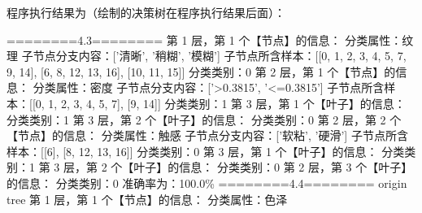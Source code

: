 \documentclass{ctexart}
\begin{document}
程序执行结果为（绘制的决策树在程序执行结果后面）：
\begin{tcolorbox}[colframe = blue, colback = blue!10!white ,  breakable]
========4.3========\newline
第 1 层，第 1 个【节点】的信息：\newline
        分类属性：纹理\newline
        子节点分支内容：['清晰', '稍糊', '模糊']\newline
        子节点所含样本：[[0, 1, 2, 3, 4, 5, 7, 9, 14], [6, 8, 12, 13, 16], [10, 11, 15]]\newline
        分类类别：0\newline
第 2 层，第 1 个【节点】的信息：\newline
        分类属性：密度\newline
        子节点分支内容：['>0.3815', '<=0.3815']\newline
        子节点所含样本：[[0, 1, 2, 3, 4, 5, 7], [9, 14]]\newline
        分类类别：1\newline
第 3 层，第 1 个【叶子】的信息：\newline
        分类类别：1\newline
第 3 层，第 2 个【叶子】的信息：\newline
        分类类别：0\newline
第 2 层，第 2 个【节点】的信息：\newline
        分类属性：触感\newline
        子节点分支内容：['软粘', '硬滑']\newline
        子节点所含样本：[[6], [8, 12, 13, 16]]\newline
        分类类别：0\newline
第 3 层，第 1 个【叶子】的信息：\newline
        分类类别：1\newline
第 3 层，第 2 个【叶子】的信息：\newline
        分类类别：0\newline
第 2 层，第 3 个【叶子】的信息：\newline
        分类类别：0\newline
准确率为：100.0\%\newline
========4.4========\newline
origin tree\newline
第 1 层，第 1 个【节点】的信息：\newline
        分类属性：色泽\newline

\end{tcolorbox}
\end{document}

